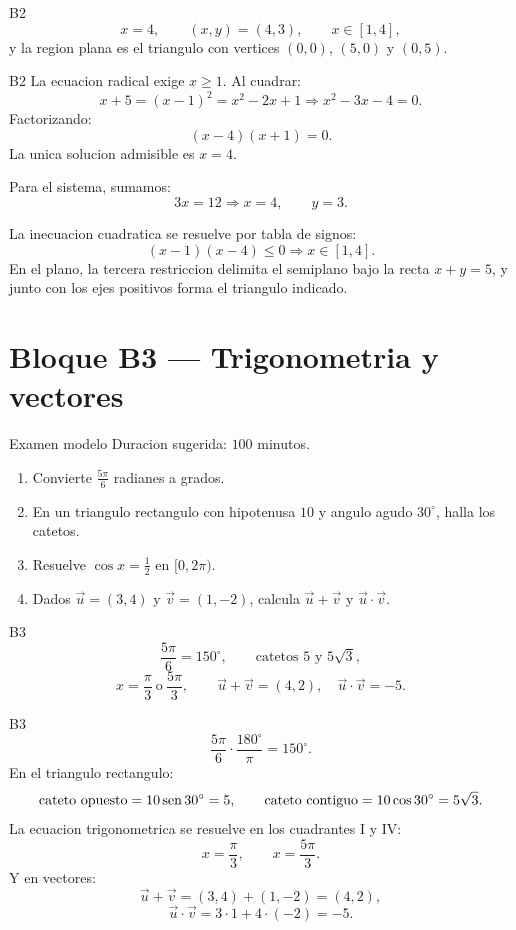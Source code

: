 \begin{shortanswer}{B2}
\[
x=4,\qquad (x,y)=(4,3),\qquad x\in[1,4],
\]
y la region plana es el triangulo con vertices \((0,0)\), \((5,0)\) y \((0,5)\).
\end{shortanswer}

\begin{fullsolution}{B2}
La ecuacion radical exige \(x\geq 1\). Al cuadrar:
\[
x+5=(x-1)^2=x^2-2x+1
\Longrightarrow x^2-3x-4=0.
\]
Factorizando:
\[
(x-4)(x+1)=0.
\]
La unica solucion admisible es \(x=4\).

Para el sistema, sumamos:
\[
3x=12 \Longrightarrow x=4,\qquad y=3.
\]

La inecuacion cuadratica se resuelve por tabla de signos:
\[
(x-1)(x-4)\leq 0 \Longrightarrow x\in[1,4].
\]
En el plano, la tercera restriccion delimita el semiplano bajo la recta \(x+y=5\), y junto con
los ejes positivos forma el triangulo indicado.
\end{fullsolution}

\section{Bloque B3 --- Trigonometria y vectores}

\begin{exambrief}{Examen modelo}
Duracion sugerida: \(100\) minutos.
\begin{enumerate}
  \item Convierte \(\frac{5\pi}{6}\) radianes a grados.
  \item En un triangulo rectangulo con hipotenusa \(10\) y angulo agudo \(30^\circ\), halla los
  catetos.
  \item Resuelve \(\cos x=\frac12\) en \([0,2\pi)\).
  \item Dados \(\vec u=(3,4)\) y \(\vec v=(1,-2)\), calcula \(\vec u+\vec v\) y
  \(\vec u\cdot \vec v\).
\end{enumerate}
\end{exambrief}

\begin{shortanswer}{B3}
\[
\frac{5\pi}{6}=150^\circ,\qquad
\text{catetos } 5 \text{ y } 5\sqrt{3},
\]
\[
x=\frac{\pi}{3}\ \text{o}\ \frac{5\pi}{3},\qquad
\vec u+\vec v=(4,2),\quad \vec u\cdot \vec v=-5.
\]
\end{shortanswer}

\begin{fullsolution}{B3}
\[
\frac{5\pi}{6}\cdot \frac{180^\circ}{\pi}=150^\circ.
\]
En el triangulo rectangulo:
\[
\text{cateto opuesto}=10\operatorname{sen} 30^\circ=5,
\qquad
\text{cateto contiguo}=10\cos 30^\circ=5\sqrt{3}.
\]
La ecuacion trigonometrica se resuelve en los cuadrantes I y IV:
\[
x=\frac{\pi}{3},\qquad x=\frac{5\pi}{3}.
\]
Y en vectores:
\[
\vec u+\vec v=(3,4)+(1,-2)=(4,2),
\]
\[
\vec u\cdot \vec v=3\cdot 1+4\cdot(-2)=-5.
\]
\end{fullsolution}

